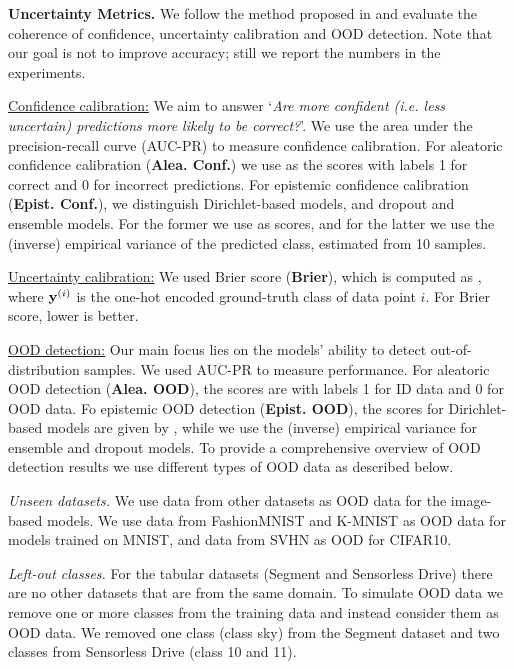 \textbf{Uncertainty Metrics.} We follow the method proposed in \cite{uncertainty_survey} and evaluate the coherence of confidence, uncertainty calibration and OOD detection. Note that our goal is not to improve accuracy; still we report the numbers in the experiments.

\underline{Confidence calibration:} We aim to answer `\textit{Are more confident (i.e. less uncertain) predictions more likely to be correct?}'. We use the area under the precision-recall curve (AUC-PR) to measure confidence calibration. For aleatoric confidence calibration (\textbf{Alea. Conf.}) we use  as the scores with labels 1 for correct and 0 for incorrect predictions. For epistemic confidence calibration (\textbf{Epist. Conf.}), we distinguish Dirichlet-based models, and dropout and ensemble models. For the former we use \smash{$\underset{\iclass}{\max}\; \bm{\alpha}_\iclass\dataix$} as scores, and for the latter we use the (inverse) empirical variance  of the predicted class, estimated from 10 samples.

\underline{Uncertainty calibration:} We used Brier score (\textbf{Brier}), which is computed as , where $\mathbf{y}^{(i)}$ is the one-hot encoded ground-truth class of data point $i$. For Brier score, lower is better.

\underline{OOD detection:} Our main focus lies on the models' ability to detect out-of-distribution samples. We used AUC-PR to measure performance. For aleatoric OOD detection (\textbf{Alea. OOD}), the scores are  with labels 1 for ID data and 0 for OOD data. Fo epistemic OOD detection (\textbf{Epist. OOD}), the scores for Dirichlet-based models are given by \smash{$\alpha_0\dataix = \sum_\iclass \alpha_\iclass\dataix$}, while we use the (inverse) empirical variance  for ensemble and dropout models. To provide a comprehensive overview of OOD detection results we use different types of OOD data as described below. 

\textit{Unseen datasets.} We use data from other datasets as OOD data for the image-based models. We use data from FashionMNIST \cite{fashionmnist} and K-MNIST \cite{kmnist}  as OOD data for models trained on MNIST, and data from SVHN \cite{svhn} as OOD for CIFAR10.

\textit{Left-out classes.} For the tabular datasets (Segment and Sensorless Drive) there are no other datasets that are from the same domain. To simulate OOD data we remove one or more classes from the training data and instead consider them as OOD data. We removed one class (class sky) from the Segment dataset and two classes from Sensorless Drive (class 10 and 11).

